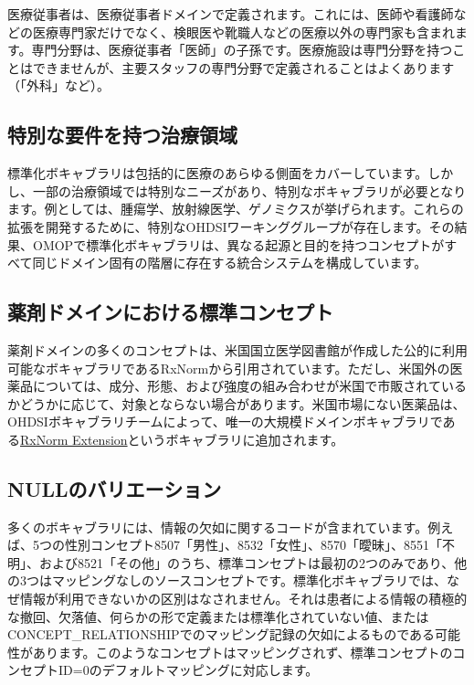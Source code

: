 \documentclass[
  11pt]{book}
\theoremstyle{definition}
\theoremstyle{definition}
\theoremstyle{definition}
\theoremstyle{definition}
\theoremstyle{remark}
\begin{document}
医療従事者は、医療従事者ドメインで定義されます。これには、医師や看護師などの医療専門家だけでなく、検眼医や靴職人などの医療以外の専門家も含まれます。専門分野は、医療従事者「医師」の子孫です。医療施設は専門分野を持つことはできませんが、主要スタッフの専門分野で定義されることはよくあります（「外科」など）。

\subsection{特別な要件を持つ治療領域}\label{ux7279ux5225ux306aux8981ux4ef6ux3092ux6301ux3064ux6cbbux7642ux9818ux57df}

標準化ボキャブラリは包括的に医療のあらゆる側面をカバーしています。しかし、一部の治療領域では特別なニーズがあり、特別なボキャブラリが必要となります。例としては、腫瘍学、放射線医学、ゲノミクスが挙げられます。これらの拡張を開発するために、特別なOHDSIワーキンググループが存在します。その結果、OMOPで標準化ボキャブラリは、異なる起源と目的を持つコンセプトがすべて同じドメイン固有の階層に存在する統合システムを構成しています。

\subsection{薬剤ドメインにおける標準コンセプト}\label{rxNormExtension}

薬剤ドメインの多くのコンセプトは、米国国立医学図書館が作成した公的に利用可能なボキャブラリであるRxNormから引用されています。ただし、米国外の医薬品については、成分、形態、および強度の組み合わせが米国で市販されているかどうかに応じて、対象とならない場合があります。米国市場にない医薬品は、OHDSIボキャブラリチームによって、唯一の大規模ドメインボキャブラリである\href{https://www.ohdsi.org/web/wiki/doku.php?id=documentation:vocabulary:rxnorm_extension}{RxNorm Extension}というボキャブラリに追加されます。

\subsection{NULLのバリエーション}\label{nullux306eux30d0ux30eaux30a8ux30fcux30b7ux30e7ux30f3}

多くのボキャブラリには、情報の欠如に関するコードが含まれています。例えば、5つの性別コンセプト8507「男性」、8532「女性」、8570「曖昧」、8551「不明」、および8521「その他」のうち、標準コンセプトは最初の2つのみであり、他の3つはマッピングなしのソースコンセプトです。標準化ボキャブラリでは、なぜ情報が利用できないかの区別はなされません。それは患者による情報の積極的な撤回、欠落値、何らかの形で定義または標準化されていない値、またはCONCEPT\_RELATIONSHIPでのマッピング記録の欠如によるものである可能性があります。このようなコンセプトはマッピングされず、標準コンセプトのコンセプトID=0のデフォルトマッピングに対応します。
\end{document}
